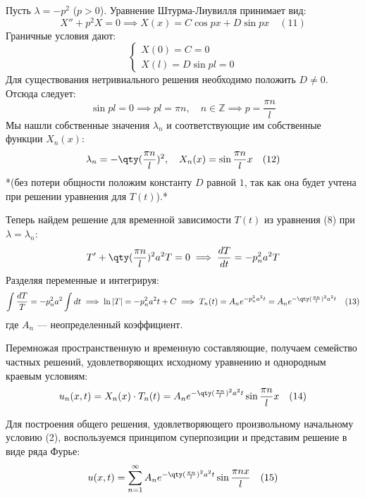 \begin{example}
	Пусть $\lambda = -p^2$ ($p > 0$). Уравнение Штурма-Лиувилля принимает вид:
	\begin{equation}
		X'' + p^2 X = 0 \implies X(x) = C \cos px + D \sin px \quad (11)
	\end{equation}
	Граничные условия дают:
	\begin{equation}
		\begin{cases}
			X(0) = C = 0 \\
			X(l) = D \sin pl = 0
		\end{cases}
	\end{equation}
	Для существования нетривиального решения необходимо положить $D \neq 0$. Отсюда следует:
	\begin{equation}
		\sin pl = 0 \implies pl = \pi n, \quad n \in \mathbb{Z} \implies p = \frac{\pi n}{l}
	\end{equation}
	Мы нашли собственные значения $\lambda_n$ и соответствующие им собственные функции $X_n(x)$:
	\begin{equation}
		\lambda_n = -\qty(\frac{\pi n}{l})^2, \quad X_n(x) = \sin \frac{\pi n}{l} x \quad (12)
	\end{equation}
	*(без потери общности положим константу $D$ равной $1$, так как она будет учтена при решении уравнения для $T(t)$).*
\end{example}

Теперь найдем решение для временной зависимости $T(t)$ из уравнения (8) при $\lambda = \lambda_n$:
\begin{equation}
	T' + \qty(\frac{\pi n}{l})^2 a^2 T = 0 \implies \frac{dT}{dt} = -p_n^2 a^2 T
\end{equation}
Разделяя переменные и интегрируя:
\begin{equation}
	\int \frac{dT}{T} = -p_n^2 a^2 \int dt \implies \ln|T| = -p_n^2 a^2 t + C \implies T_n(t) = A_n e^{-p_n^2 a^2 t} = A_n e^{-\qty(\frac{\pi n}{l})^2 a^2 t} \quad (13)
\end{equation}
где $A_n$ --- неопределенный коэффициент.

Перемножая пространственную и временную составляющие, получаем семейство частных решений, удовлетворяющих исходному уравнению и однородным краевым условиям:
\begin{equation}
	u_n(x,t) = X_n(x) \cdot T_n(t) = A_n e^{-\qty(\frac{\pi n}{l})^2 a^2 t} \sin \frac{\pi n}{l} x \quad (14)
\end{equation}

Для построения общего решения, удовлетворяющего произвольному начальному условию (2), воспользуемся принципом суперпозиции и представим решение в виде ряда Фурье:
\begin{equation}
	u(x,t) = \sum_{n=1}^{\infty} A_n e^{-\qty(\frac{\pi n}{l})^2 a^2 t} \sin \frac{\pi n x}{l} \quad (15)
\end{equation}

